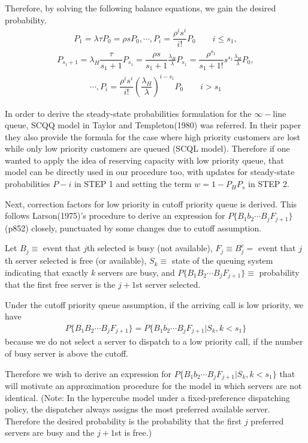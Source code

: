 \documentclass{article}
\begin{document}
Therefore, by solving the following balance equations, we gain the desired probability.
\begin{align*} P_1= \lambda \tau P_0 =\rho s P_0, \cdots, P_i = \dfrac{\rho^i s^i}{i!} P_0 \quad \quad i\leq s_1,
\end{align*}
\begin{align*}
P_{s_1+1} = \lambda_H \dfrac{\tau}{ s_1+1} P_{s_1}=\dfrac{\rho s}{s_1+1} \frac{\lambda_H}{\lambda} P_{s_1}=\dfrac{\rho^{s_1}}{s_1+1!} s^{s_1} \frac{\lambda_H}{\lambda} P_{0},
\end{align*}
\begin{align*}
\cdots, P_i = \dfrac{\rho^i s^i}{i!} (\dfrac{\lambda_H}{\lambda})^{i-s_1} P_0 \quad \quad i > s_1
\end{align*}

In order to derive the steady-state probabilities formulation for the $\infty-$line queue, SCQQ model in Taylor and Templeton(1980) was referred. In their paper they also provide the formula for the case where high priority customers are lost while only low priority customers are queued (SCQL model). Therefore if one wanted to apply the idea of reserving capacity with low priority queue, that model can be directly used in our procedure too, with updates for steady-state probabilities $P-i$ in STEP 1 and setting the term $w=1-P_HP_s$ in STEP 2. 

Next, correction factors for low priority in cutoff priority queue is derived. This follows Larson(1975)'s procedure to derive an expression for $P \{ B_1b_2 \cdots B_jF_{j+1}\}$ (p852) closely, punctuated by some changes due to cutoff assumption.

Let $B_j \equiv $ event that $j$th selected is busy (not available), $F_j \equiv B_j^c =$ event that $j$th server selected is free (or available), $S_k \equiv $  state of the queuing system indicating that exactly $k$ servers are busy, and $P \{ B_1B_2 \cdots B_j F_{j+1}\} \equiv $ probability that the first free server is the $j+1$st server selected.

Under the cutoff priority queue assumption, if the arriving call is low priority, we have
\begin{align*}P \{ B_1B_2 \cdots B_j F_{j+1}\}=P \{ B_1b_2 \cdots B_jF_{j+1}|S_k,k<s_1\}
\end{align*}
because we do not select a server to dispatch to a low priority call, if the number of busy server is above the cutoff.

Therefore we wish to derive an expression for $P \{ B_1b_2 \cdots B_jF_{j+1}|S_k,k<s_1\}$ that will motivate an approximation procedure for the model in which servers are not identical. (Note: In the hypercube model under a fixed-preference dispatching policy, the dispatcher always assigns the most preferred available server. Therefore the desired probability is the probability that the first $j$ preferred servers are busy and the $j+1$st is free.)
\end{document}
